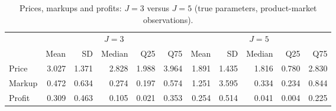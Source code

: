 \begin{table}[H]
\centering\small
\caption{Prices, markups and profits: $J=3$ versus $J=5$ (true parameters, product-market observations).}\label{tab:q6a_desc}
\begin{adjustbox}{max width=\linewidth}
\begin{tabular}{lrrrrrrrrrr}
\toprule
& \multicolumn{5}{c}{$J=3$} & \multicolumn{5}{c}{$J=5$} \\
\cmidrule(lr){2-6} \cmidrule(lr){7-11}
 & Mean & SD & Median & Q25 & Q75 & Mean & SD & Median & Q25 & Q75 \\
\midrule
Price & 3.027 & 1.371 & 2.828 & 1.988 & 3.964 & 1.891 & 1.435 & 1.816 & 0.780 & 2.830 \\
Markup & 0.472 & 0.634 & 0.274 & 0.197 & 0.574 & 1.251 & 3.595 & 0.334 & 0.234 & 0.844 \\
Profit & 0.309 & 0.463 & 0.105 & 0.021 & 0.353 & 0.254 & 0.514 & 0.041 & 0.004 & 0.225 \\
\bottomrule
\end{tabular}
\end{adjustbox}
\par\vspace{3pt}{\footnotesize Pooled over products and markets (300 observations for $J=3$, 500 for $J=5$; 475 markups for $J=5$). Markup is $(p-c)/p$. 25 $J=5$ observations with markup $<-1$ are excluded from the markup row and from the markup figure. The markup figure also truncates the x-axis at the 95th percentile.}
\end{table}
